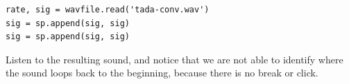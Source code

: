 \begin{lstlisting}
rate, sig = wavfile.read('tada-conv.wav')
sig = sp.append(sig, sig)
sig = sp.append(sig, sig)
\end{lstlisting}

Listen to the resulting sound, and notice that we are not able to identify where the sound loops back to the beginning, because there is no break or click.

%



